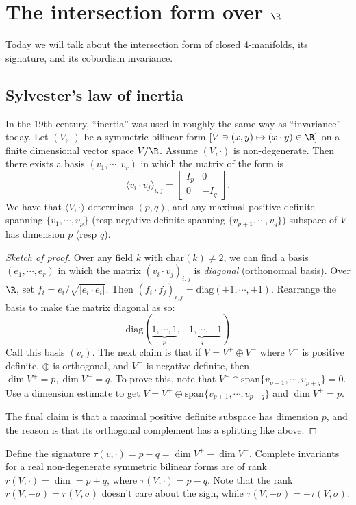 \section{The intersection form over $\R$} 
Today we will talk about the intersection form  of closed 4-manifolds, its signature, and its cobordism invariance. 

\subsection{Sylvester's law of inertia}
In the 19th century, ``inertia'' was used in roughly the same way as ``invariance'' today. Let $(V, \cdot )$ be a symmetric bilinear form $[V\ni (x,y) \mapsto  (x \cdot y)\in  \R]$ on a finite dimensional vector space $V /\R$. Assume $(V, \cdot )$ is non-degenerate. Then there exists a basis $(v_1,\cdots ,v_r)$ in which the matrix of the form is \[
\langle v_i  \cdot v_j  \rangle _{i,j}= 
\begin{bmatrix}
    I_p & 0 \\ 0 & -I_q
\end{bmatrix}.
\] We have that $\langle V,\cdot  \rangle $ determines $(p,q)$, and any maximal positive definite spanning $\{v_1,\cdots ,v_p\} $ (resp negative definite spanning $\{v_{p+1},\cdots ,v_q\} $) subspace of  $V$ has dimension  $p$ (resp  $q$).
\begin{proof}[Sketch of proof]
    Over any field $k$ with $\mathrm{char}(k) \neq 2$, we can find a basis  $(e_1 ,\cdots ,e_r)$ in which the matrix $(v_i  \cdot v_j )_{i,j}$ is \emph{diagonal} (orthonormal basis). Over $\R$, set $f_i  = e_i / \sqrt{|e_i  \cdot e_i |} $. Then $(f_i \cdot f_j ) _{i,j}= \mathrm{diag}(\pm 1, \cdots ,\pm 1)$. Rearrange the basis to make the matrix diagonal as so: 
    \[
    \mathrm{diag}(\underset{p}{\underbrace{1,\cdots ,1}} ,\underset{q}{\underbrace{-1,\cdots ,-1}} )
\] Call this basis $(v_i )$. The next claim is that if $V = V ^+\oplus V^-$ where  $V^+$ is positive definite, $\oplus$ is orthogonal, and $V^-$ is negative definite, then $\dim V^+ = p, \dim V^- = q$. To prove this, note that $V^+ \cap  \mathrm{span}\{v _{p+1},\cdots ,v_{p+q}\} =0$. Use a dimension estimate to get $V = V^+ \oplus \mathrm{span}\{v_{p+1},\cdots ,v_{p+q}\} $ and $\dim V^+ = p$. 

The final claim is that a maximal positive definite subspace has dimension  $p$, and the reason is that its orthogonal complement has a splitting like above.
\end{proof}
Define the signature $\tau (v,\cdot ) = p-q = \dim V^+ - \dim V^-$. Complete invariants for a real non-degenerate symmetric bilinear forms are of rank $r(V,\cdot )= \dim = p+q$, where $\tau(V, \cdot ) = p-q$. Note that the rank $r(V, -\sigma)= r(V, \sigma)$ doesn't care about the sign, while $\tau(V,-\sigma)=-\tau(V,\sigma)$. 


